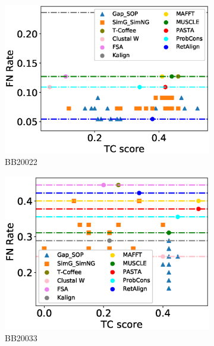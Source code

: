 \begin{figure}[!htbp]
\begin{adjustwidth}{-1.5cm}{-1cm}
\begin{subfigure}{0.22\textwidth}
			\includegraphics[width=\columnwidth]{Figure/summary/precomputedInit/Balibase/BB20022_fnrate_vs_tc_2}
			\caption{BB20022}
		\end{subfigure}
		\begin{subfigure}{0.22\textwidth}
			\includegraphics[width=\columnwidth]{Figure/summary/precomputedInit/Balibase/BB20033_fnrate_vs_tc_2}
			\caption{BB20033}
		\end{subfigure}	
		\begin{subfigure}{0.22\textwidth}

\end{subfigure}
\end{adjustwidth}
\end{figure}
